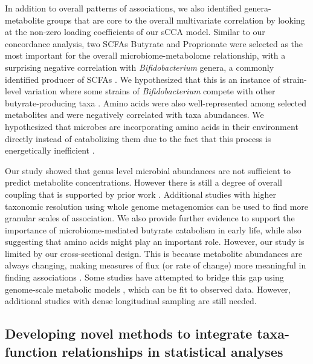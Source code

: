 In addition to overall patterns of associations, we also identified genera-metabolite groups that are core to the overall multivariate correlation by looking at the non-zero loading coefficients of our sCCA model. Similar to our concordance analysis, two SCFAs Butyrate and Proprionate were selected as the most important for the overall microbiome-metabolome relationship, with a surprising negative correlation with \emph{Bifidobacterium} genera, a commonly identified producer of SCFAs \cite{james2019metabolism}. We hypothesized that this is an instance of strain-level variation where some strains of \emph{Bifidobacterium} compete with other butyrate-producing taxa \cite{riviere2016bifidobacteria}. Amino acids were also well-represented among selected metabolites and were negatively correlated with taxa abundances. We hypothesized that microbes are incorporating amino acids in their environment directly instead of catabolizing them due to the fact that this process is energetically inefficient \cite{franzosa2014relating, oliphant2019macronutrient}. 

Our study showed that genus level microbial abundances are not sufficient to predict metabolite concentrations. However there is still a degree of overall coupling that is supported by prior work \cite{ayeni2018infant, kisuse2018urban, zierer2018fecal}. Additional studies with higher taxonomic resolution using whole genome metagenomics can be used to find more granular scales of association. We also provide further evidence to support the importance of microbiome-mediated butyrate catabolism in early life, while also suggesting that amino acids might play an important role. However, our study is limited by our cross-sectional design. This is because metabolite abundances are always changing, making measures of flux (or rate of change) more meaningful in finding associations \cite{hollywood2006metabolomics}. Some studies have attempted to bridge this gap using genome-scale metabolic models \cite{noecker2019defining}, which can be fit to observed data. However, additional studies with dense longitudinal sampling are still needed.   

\subsection{Developing novel methods to integrate taxa-function relationships in statistical analyses}

